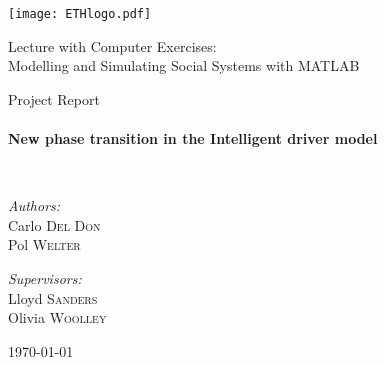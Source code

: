 \begin{titlepage} \begin{center}
        
    \begin{flushright}
        \texttt{[image: ETHlogo.pdf]}~\\[1cm]
    \end{flushright}
        
        
    \vspace{4cm}
    \LARGE{ 	Lecture with Computer Exercises:\\ }
    \LARGE{ Modelling and Simulating Social Systems with MATLAB\\}
    
    \bigskip\bigskip
    
    \small{Project Report}\\
    
            
    \HRule \\[0.4cm] { \huge \bfseries New phase transition in the Intelligent driver model\\[0.4cm] }
    
    \HRule \\[1.5cm]
    
    \noindent 
    \begin{minipage}[t]{0.4\textwidth} 
        \begin{flushleft} 
            \large \emph{Authors:}\\ Carlo \textsc{Del Don}\\ Pol \textsc{Welter} 
        \end{flushleft} 
    \end{minipage}
    \begin{minipage}[t]{0.4\textwidth}
        \begin{flushright}
            \large \emph{Supervisors:} \\
            Lloyd \textsc{Sanders} \\
            Olivia \textsc{Woolley} \\
        \end{flushright}
    \end{minipage}
    
    \vfill
    
    {\large \today}
        
\end{center} \end{titlepage}